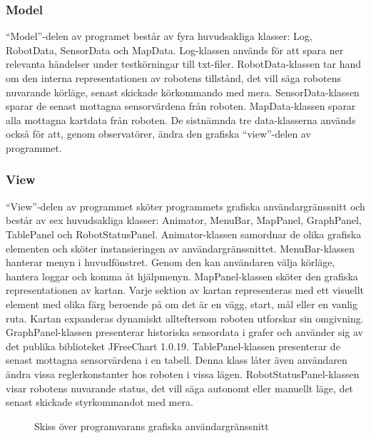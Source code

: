\documentclass[11pt]{article}
\begin{document}
\begin{flushleft}
\subsubsection{Model}
``Model''-delen av programet består av fyra huvudsakliga klasser: Log, RobotData, SensorData och MapData. 
Log-klassen används för att spara ner relevanta händelser under testkörningar till txt-filer. 
RobotData-klassen tar hand om den interna representationen av robotens tillstånd, det vill säga robotens nuvarande körläge, senast skickade körkommando med mera. 
SensorData-klassen sparar de senast mottagna sensorvärdena från roboten. 
MapData-klassen sparar alla mottagna kartdata från roboten. De sistnämnda tre data-klasserna används också för att, genom observatörer, ändra den grafiska ``view''-delen av programmet.

\subsubsection{View}
``View''-delen av programmet sköter programmets grafiska användargränssnitt och består av sex huvudsakliga klasser: Animator, MenuBar, MapPanel, GraphPanel, TablePanel och RobotStatusPanel. Animator-klassen samordnar de olika grafiska elementen och sköter instansieringen av användargränssnittet. 
MenuBar-klassen hanterar menyn i huvudfönstret. Genom den kan användaren välja körläge, hantera loggar och komma åt hjälpmenyn. 
MapPanel-klassen sköter den grafiska representationen av kartan. Varje sektion av kartan representeras med ett visuellt element med olika färg beroende på om det är en vägg, start, mål eller en vanlig ruta. Kartan expanderas dynamiskt allteftersom roboten utforskar sin omgivning. 
GraphPanel-klassen presenterar historiska sensordata i grafer och använder sig av det publika biblioteket JFreeChart 1.0.19. 
TablePanel-klassen presenterar de senast mottagna sensorvärdena i en tabell. Denna klass låter även användaren ändra vissa reglerkonstanter hos roboten i vissa lägen.
RobotStatusPanel-klassen visar robotens nuvarande status, det vill säga autonomt eller manuellt läge, det senast skickade styrkommandot med mera.

\begin{figure}[H]
\centering
\noindent\resizebox{.8\linewidth}{!}{
	}
	\caption{Skiss över programvarans grafiska användargränssnitt\label{software}}	
\end{figure}


\end{flushleft}
\end{document}
